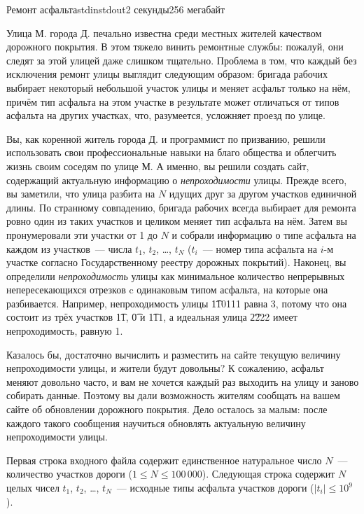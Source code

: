 \begin{problem}{Ремонт асфальта}{stdin}{stdout}{2 секунды}{256 мегабайт}

Улица М. города Д. печально известна среди местных жителей качеством дорожного покрытия. В этом тяжело винить ремонтные службы: пожалуй, они следят за этой улицей даже слишком тщательно. Проблема в том, что каждый без исключения ремонт улицы выглядит следующим образом: бригада рабочих выбирает некоторый небольшой участок улицы и меняет асфальт только на нём, причём тип асфальта на этом участке в результате может отличаться от типов асфальта на других участках, что, разумеется, усложняет проезд по улице.

Вы, как коренной житель города Д. и программист по призванию, решили использовать свои профессиональные навыки на благо общества и облегчить жизнь своим соседям по улице М. А именно, вы решили создать сайт, содержащий актуальную информацию о \emph{непроходимости} улицы. Прежде всего, вы заметили, что улица разбита на $N$ идущих друг за другом участков единичной длины. По странному совпадению, бригада рабочих всегда выбирает для ремонта ровно один из таких участков и целиком меняет тип асфальта на нём. Затем вы пронумеровали эти участки от 1 до $N$ и собрали информацию о типе асфальта на каждом из участков~--- числа $t_1$, $t_2$, \ldots, $t_N$ ($t_i$~--- номер типа асфальта на $i$-м участке согласно Государственному реестру дорожных покрытий). Наконец, вы определили \emph{непроходимость} улицы как минимальное количество непрерывных непересекающихся отрезков c одинаковым типом асфальта, на которые она разбивается. Например, непроходимость улицы \t{110111} равна 3, потому что она состоит из трёх участков \t{11}, \t{0} и \t{111}, а идеальная улица \t{2222} имеет непроходимость, равную 1.

Казалось бы, достаточно вычислить и разместить на сайте текущую величину непроходимости улицы, и жители будут довольны? К сожалению, асфальт меняют довольно часто, и вам не хочется каждый раз выходить на улицу и заново собирать данные. Поэтому вы дали возможность жителям сообщать на вашем сайте об обновлении дорожного покрытия. Дело осталось за малым: после каждого такого сообщения научиться обновлять актуальную величину непроходимости улицы.

\InputFile
Первая строка входного файла содержит единственное натуральное число $N$~--- количество участков дороги  ($1 \le N \le 100\,000$). Следующая строка содержит $N$ целых чисел $t_1$, $t_2$, \ldots, $t_N$~--- исходные типы асфальта участков дороги ($|t_i| \le 10^9$).


\end{problem}
